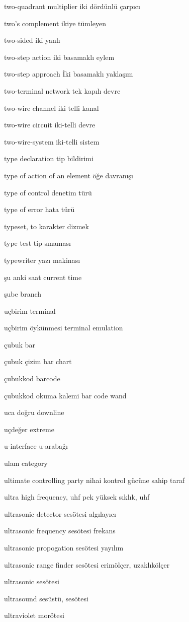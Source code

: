 \documentclass[12pt,fleqn]{article}\usepackage{../../common}
\begin{document}
two-quadrant multiplier iki dördünlü çarpıcı

two's complement ikiye tümleyen

two-sided iki yanlı

two-step action iki basamaklı eylem

two-step approach İki basamaklı yaklaşım

two-terminal network tek kapılı devre

two-wire channel iki telli kanal

two-wire circuit iki-telli devre

two-wire-system iki-telli sistem

type declaration tip bildirimi

type of action of an element öğe davranışı

type of control denetim türü

type of error hata türü

typeset, to karakter dizmek

type test tip sınaması

typewriter yazı makinası

şu anki saat current time

şube branch

uçbirim terminal

uçbirim öykünmesi terminal emulation

çubuk bar

çubuk çizim bar chart

çubukkod barcode

çubukkod okuma kalemi bar code wand

uca doğru downline

uçdeğer extreme

u-interface u-arabağı

ulam category

ultimate controlling party nihai kontrol gücüne sahip taraf

ultra high frequency, uhf pek yüksek sıklık, uhf

ultrasonic detector sesötesi algılayıcı

ultrasonic frequency sesötesi frekans

ultrasonic propogation sesötesi yayılım

ultrasonic range finder sesötesi erimölçer, uzaklıkölçer

ultrasonic sesötesi

ultrasound sesüstü, sesötesi

ultraviolet morötesi
\end{document}
